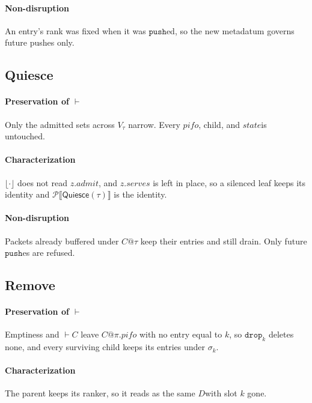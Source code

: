 \documentclass[sigplan,anonymous,review,nonacm]{acmart}
\newcommand{\push}{\ensuremath{\mathtt{push}}}
\newcommand{\psem}[1]{\mathcal{P}\llbracket #1 \rrbracket}
\newcommand{\notation}[1]{\ensuremath{#1}\ifmmode\else\xspace\fi}
\newcommand{\pifo}{\notation{\mathit{pifo}}}
\newcommand{\stt}{\notation{\mathit{state}}}
\newcommand{\disc}{\notation{D}}
\newcommand{\Quiesce}{\textsf{Quiesce}}
\newcommand{\Remove}{\textsf{Remove}}
\begin{document}
\paragraph{Non-disruption}
An entry's rank was fixed when it was \push{}ed, so the new metadatum governs future pushes only.

\subsection{\texorpdfstring{\Quiesce}{Quiesce}}\label{sec:check-quiesce}

\paragraph{Preservation of \(\vdash\)}
Only the admitted sets across \(V_\tau\) narrow.
Every \pifo, child, and \stt is untouched.

\paragraph{Characterization}
\(\lfloor \cdot \rfloor\) does not read \(\mathit{z}.\mathit{admit}\), and \(\mathit{z}.\mathit{serves}\) is left in place, so a silenced leaf keeps its identity and \(\psem{\Quiesce(\tau)}\) is the identity.

\paragraph{Non-disruption}
Packets already buffered under \(C@\tau\) keep their entries and still drain.
Only future \push{}es are refused.

\subsection{\texorpdfstring{\Remove}{Remove}}\label{sec:check-remove}

\paragraph{Preservation of \(\vdash\)}
Emptiness and \(\vdash C\) leave \(C@\pi.\mathit{pifo}\) with no entry equal to \(k\), so \(\mathtt{drop}_k\) deletes none, and every surviving child keeps its entries under \(\sigma_k\).

\paragraph{Characterization}
The parent keeps its ranker, so it reads as the same \disc with slot \(k\) gone.
\end{document}

